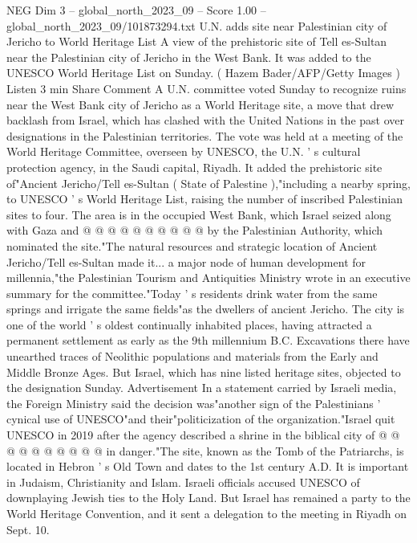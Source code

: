 \begin{textsample}{NEG Dim 3 – global\_north\_2023\_09 – Score 1.00 – global\_north\_2023\_09/101873294.txt}  \label{ex:f3_neg_390}
U.N. adds site near Palestinian city of Jericho to World Heritage List A view of the prehistoric site of Tell es-Sultan near the Palestinian city of Jericho in the West Bank.
It was added to the UNESCO World Heritage List on Sunday. ( Hazem Bader/AFP/Getty Images ) Listen 3 min Share Comment A U.N. committee voted Sunday to recognize ruins near the West Bank city of Jericho as a World Heritage site, a move that drew backlash from Israel, which has clashed with the United Nations in the past over designations in the Palestinian territories.
The vote was held at a meeting of the World Heritage Committee, overseen by UNESCO, the U.N. ' s cultural protection agency, in the Saudi capital, Riyadh.
It added the prehistoric site of"Ancient Jericho/Tell es-Sultan ( State of Palestine ),"including a nearby spring, to UNESCO ' s World Heritage List, raising the number of inscribed Palestinian sites to four.
The area is in the occupied West Bank, which Israel seized along with Gaza and @ @ @ @ @ @ @ @ @ @ by the Palestinian Authority, which nominated the site."The natural resources and strategic location of Ancient Jericho/Tell es-Sultan made it... a major node of human development for millennia,"the Palestinian Tourism and Antiquities Ministry wrote in an executive summary for the committee."Today ' s residents drink water from the same springs and irrigate the same fields"as the dwellers of ancient Jericho.
The city is one of the world ' s oldest continually inhabited places, having attracted a permanent settlement as early as the 9th millennium B.C.
Excavations there have unearthed traces of Neolithic populations and materials from the Early and Middle Bronze Ages.
But Israel, which has nine listed heritage sites, objected to the designation Sunday.
Advertisement In a statement carried by Israeli media, the Foreign Ministry said the decision was"another sign of the Palestinians ' cynical use of UNESCO"and their"politicization of the organization."Israel quit UNESCO in 2019 after the agency described a shrine in the biblical city of @ @ @ @ @ @ @ @ @ @ in danger."The site, known as the Tomb of the Patriarchs, is located in Hebron ' s Old Town and dates to the 1st century A.D.
It is important in Judaism, Christianity and Islam.
Israeli officials accused UNESCO of downplaying Jewish ties to the Holy Land.
But Israel has remained a party to the World Heritage Convention, and it sent a delegation to the meeting in Riyadh on Sept. 10.

\end{textsample}
